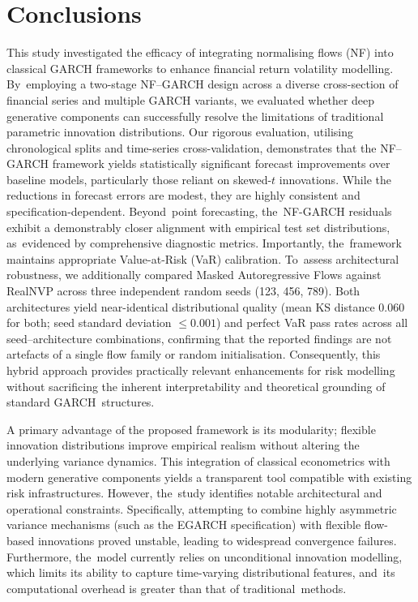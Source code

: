 \documentclass[risks,article,accept,pdftex,moreauthors]{Definitions/mdpi}
\begin{document}
\section{Conclusions}
\label{sec:conclusion}

This study investigated the efficacy of integrating normalising flows (NF) into classical GARCH frameworks to enhance financial return volatility modelling. By~employing a two-stage NF–GARCH design across a diverse cross-section of financial series and multiple GARCH variants, we evaluated whether deep generative components can successfully resolve the limitations of traditional parametric innovation distributions. Our rigorous evaluation, utilising chronological splits and time-series cross-validation, demonstrates that the NF–GARCH framework yields statistically significant forecast improvements over baseline models, particularly those reliant on skewed-$t$ innovations. While the reductions in forecast errors are modest, they are highly consistent and specification-dependent. Beyond~point forecasting, the~NF-GARCH residuals exhibit a demonstrably closer alignment with empirical test set distributions, as~evidenced by comprehensive diagnostic metrics. Importantly, the~framework maintains appropriate Value-at-Risk (VaR) calibration. To~assess architectural robustness, we additionally compared Masked Autoregressive Flows against RealNVP across three independent random seeds (123, 456, 789). Both architectures yield near-identical distributional quality (mean KS distance 0.060 for both; seed standard deviation $\leq 0.001$) and perfect VaR pass rates across all seed--architecture combinations, confirming that the reported findings are not artefacts of a single flow family or random initialisation. Consequently, this hybrid approach provides practically relevant enhancements for risk modelling without sacrificing the inherent interpretability and theoretical grounding of standard GARCH~structures.

A primary advantage of the proposed framework is its modularity; flexible innovation distributions improve empirical realism without altering the underlying variance dynamics. This integration of classical econometrics with modern generative components yields a transparent tool compatible with existing risk infrastructures. However, the~study identifies notable architectural and operational constraints. Specifically, attempting to combine highly asymmetric variance mechanisms (such as the EGARCH specification) with flexible flow-based innovations proved unstable, leading to widespread convergence failures. Furthermore, the~model currently relies on unconditional innovation modelling, which limits its ability to capture time-varying distributional features, and~its computational overhead is greater than that of traditional~methods.
\end{document}
